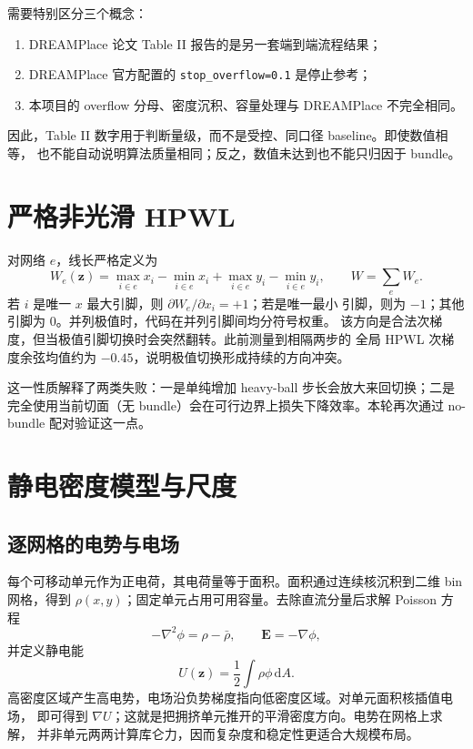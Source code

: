 \documentclass[UTF8,fontset=windows,a4paper,11pt]{ctexart}
\newcommand{\code}[1]{\texttt{#1}}
\begin{document}
需要特别区分三个概念：
\begin{enumerate}
  \item DREAMPlace 论文 Table II 报告的是另一套端到端流程结果；
  \item DREAMPlace 官方配置的 \code{stop\_overflow=0.1} 是停止参考；
  \item 本项目的 overflow 分母、密度沉积、容量处理与 DREAMPlace 不完全相同。
\end{enumerate}
因此，Table II 数字用于判断量级，而不是受控、同口径 baseline。即使数值相等，
也不能自动说明算法质量相同；反之，数值未达到也不能只归因于 bundle。

\section{严格非光滑 HPWL}

对网络 $e$，线长严格定义为
\begin{equation}
 W_e(\bm z)=\max_{i\in e}x_i-\min_{i\in e}x_i+
             \max_{i\in e}y_i-\min_{i\in e}y_i,
 \qquad W=\sum_e W_e.
 \label{eq:hpwl}
\end{equation}
若 $i$ 是唯一 $x$ 最大引脚，则 $\partial W_e/\partial x_i=+1$；若是唯一最小
引脚，则为 $-1$；其他引脚为 0。并列极值时，代码在并列引脚间均分符号权重。
该方向是合法次梯度，但当极值引脚切换时会突然翻转。此前测量到相隔两步的
全局 HPWL 次梯度余弦均值约为 $-0.45$，说明极值切换形成持续的方向冲突。

这一性质解释了两类失败：一是单纯增加 heavy-ball 步长会放大来回切换；二是
完全使用当前切面（无 bundle）会在可行边界上损失下降效率。本轮再次通过
no-bundle 配对验证这一点。

\section{静电密度模型与尺度}

\subsection{逐网格的电势与电场}

每个可移动单元作为正电荷，其电荷量等于面积。面积通过连续核沉积到二维 bin
网格，得到 $\rho(x,y)$；固定单元占用可用容量。去除直流分量后求解 Poisson
方程
\begin{equation}
 -\nabla^2\phi=\rho-\bar\rho,
 \qquad \bm E=-\nabla\phi,
 \label{eq:poisson}
\end{equation}
并定义静电能
\begin{equation}
 U(\bm z)=\frac{1}{2}\int\rho\phi\,\mathrm dA.
\end{equation}
高密度区域产生高电势，电场沿负势梯度指向低密度区域。对单元面积核插值电场，
即可得到 $\nabla U$；这就是把拥挤单元推开的平滑密度方向。电势在网格上求解，
并非单元两两计算库仑力，因而复杂度和稳定性更适合大规模布局。
\end{document}
